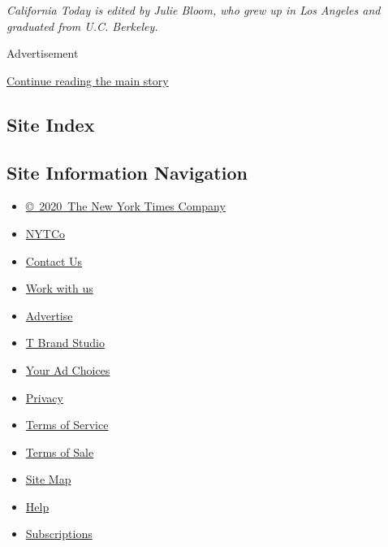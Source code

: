 \emph{California Today is edited by Julie Bloom, who grew up in Los
Angeles and graduated from U.C. Berkeley.}

Advertisement

\protect\hyperlink{after-bottom}{Continue reading the main story}

\hypertarget{site-index}{%
\subsection{Site Index}\label{site-index}}

\hypertarget{site-information-navigation}{%
\subsection{Site Information
Navigation}\label{site-information-navigation}}

\begin{itemize}
\tightlist
\item
  \href{https://help.nytimes3xbfgragh.onion/hc/en-us/articles/115014792127-Copyright-notice}{©~2020~The
  New York Times Company}
\end{itemize}

\begin{itemize}
\tightlist
\item
  \href{https://www.nytco.com/}{NYTCo}
\item
  \href{https://help.nytimes3xbfgragh.onion/hc/en-us/articles/115015385887-Contact-Us}{Contact
  Us}
\item
  \href{https://www.nytco.com/careers/}{Work with us}
\item
  \href{https://nytmediakit.com/}{Advertise}
\item
  \href{http://www.tbrandstudio.com/}{T Brand Studio}
\item
  \href{https://www.nytimes3xbfgragh.onion/privacy/cookie-policy\#how-do-i-manage-trackers}{Your
  Ad Choices}
\item
  \href{https://www.nytimes3xbfgragh.onion/privacy}{Privacy}
\item
  \href{https://help.nytimes3xbfgragh.onion/hc/en-us/articles/115014893428-Terms-of-service}{Terms
  of Service}
\item
  \href{https://help.nytimes3xbfgragh.onion/hc/en-us/articles/115014893968-Terms-of-sale}{Terms
  of Sale}
\item
  \href{https://spiderbites.nytimes3xbfgragh.onion}{Site Map}
\item
  \href{https://help.nytimes3xbfgragh.onion/hc/en-us}{Help}
\item
  \href{https://www.nytimes3xbfgragh.onion/subscription?campaignId=37WXW}{Subscriptions}
\end{itemize}
